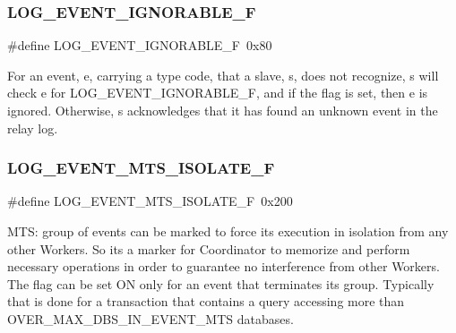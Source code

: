 \subsubsection{\texorpdfstring{L\+O\+G\+\_\+\+E\+V\+E\+N\+T\+\_\+\+I\+G\+N\+O\+R\+A\+B\+L\+E\+\_\+F}{LOG\_EVENT\_IGNORABLE\_F}}
{\footnotesize\ttfamily \#define L\+O\+G\+\_\+\+E\+V\+E\+N\+T\+\_\+\+I\+G\+N\+O\+R\+A\+B\+L\+E\+\_\+F~0x80}

For an event, \textquotesingle{}e\textquotesingle{}, carrying a type code, that a slave, \textquotesingle{}s\textquotesingle{}, does not recognize, \textquotesingle{}s\textquotesingle{} will check \textquotesingle{}e\textquotesingle{} for L\+O\+G\+\_\+\+E\+V\+E\+N\+T\+\_\+\+I\+G\+N\+O\+R\+A\+B\+L\+E\+\_\+F, and if the flag is set, then \textquotesingle{}e\textquotesingle{} is ignored. Otherwise, \textquotesingle{}s\textquotesingle{} acknowledges that it has found an unknown event in the relay log. \mbox{\label{group__Replication_gaff6f295f5279245c4c78060da0d8ada5}} 
\subsubsection{\texorpdfstring{L\+O\+G\+\_\+\+E\+V\+E\+N\+T\+\_\+\+M\+T\+S\+\_\+\+I\+S\+O\+L\+A\+T\+E\+\_\+F}{LOG\_EVENT\_MTS\_ISOLATE\_F}}
{\footnotesize\ttfamily \#define L\+O\+G\+\_\+\+E\+V\+E\+N\+T\+\_\+\+M\+T\+S\+\_\+\+I\+S\+O\+L\+A\+T\+E\+\_\+F~0x200}

M\+TS\+: group of events can be marked to force its execution in isolation from any other Workers. So it\textquotesingle{}s a marker for Coordinator to memorize and perform necessary operations in order to guarantee no interference from other Workers. The flag can be set ON only for an event that terminates its group. Typically that is done for a transaction that contains a query accessing more than O\+V\+E\+R\+\_\+\+M\+A\+X\+\_\+\+D\+B\+S\+\_\+\+I\+N\+\_\+\+E\+V\+E\+N\+T\+\_\+\+M\+TS databases. \mbox{\label{group__Replication_ga952d3046c7945be04d6e8a7dfabc3f91}} 
